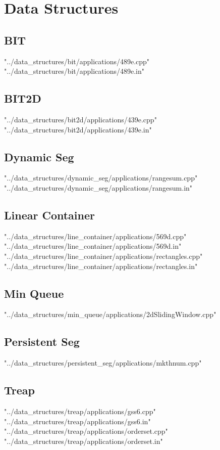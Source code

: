 \documentclass [12pt,onecolumn,oneside]{article}
\begin{document}
\pagestyle{fancy}
\fancyfoot{}
\fancyhead[R]{\thepage}
\renewcommand{\headrulewidth}{0.4pt}
\tableofcontents
\scriptsize

\bigskip

\section{Data Structures}
\subsection{ BIT}
 {"../data_structures/bit/applications/489e.cpp"}
 {"../data_structures/bit/applications/489e.in"}
\subsection{ BIT2D}
 {"../data_structures/bit2d/applications/439e.cpp"}
 {"../data_structures/bit2d/applications/439e.in"}
\subsection{ Dynamic Seg}
 {"../data_structures/dynamic_seg/applications/rangesum.cpp"}
 {"../data_structures/dynamic_seg/applications/rangesum.in"}
\subsection{ Linear Container}
 {"../data_structures/line_container/applications/569d.cpp"}
 {"../data_structures/line_container/applications/569d.in"}
 {"../data_structures/line_container/applications/rectangles.cpp"}
 {"../data_structures/line_container/applications/rectangles.in"}
\subsection{ Min Queue}
 {"../data_structures/min_queue/applications/2dSlidingWindow.cpp"}
\subsection{ Persistent Seg}
 {"../data_structures/persistent_seg/applications/mkthnum.cpp"}
\subsection{ Treap}
 {"../data_structures/treap/applications/gss6.cpp"}
 {"../data_structures/treap/applications/gss6.in"}
 {"../data_structures/treap/applications/orderset.cpp"}
 {"../data_structures/treap/applications/orderset.in"}
\end{document}
